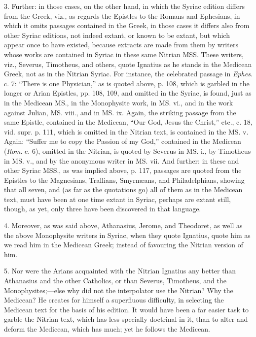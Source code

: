 3. Further: in those cases, on
the other hand, in which the Syriac edition differs from the Greek,
viz., as regards the Epistles to the Romans and Ephesians, in which it
omits passages contained in the Greek, in those cases it differs also
from other Syriac editions, not indeed extant, or known to be extant,
but which appear once to have existed, because extracts are made from
them by writers whose works are contained in Syriac in these same
Nitrian MSS. These writers, viz., Severus, Timotheus, and others,
quote Ignatius as he stands in the Medicean Greek, not as in the
Nitrian Syriac. For instance, the celebrated passage in \emph{Ephes}.
c. 7: ``There is one Physician,'' as is quoted above, p. 108, which
is garbled in the longer or Arian Epistles, pp. 108, 109, and omitted
in the Syriac, is found, just as in the Medicean MS., in the
Monophysite work, in MS. vi., and in the work against Julian, MS.
viii., and in MS. ix. Again, the striking passage from the same
Epistle, contained in the Medicean, ``Our God, Jesus the Christ,'' etc.,
c. 18, vid. supr. p. 111, which is omitted in the Nitrian text, is
contained in the MS. v. Again: ``Suffer me to copy the Passion of
my God,'' contained in the Medicean (\emph{Rom}. c. 6), omitted in the
Nitrian, is quoted by Severus in MS. i., by Timotheus in MS. v., and
by the anonymous writer in MS. vii. And further: in these and other
Syriac MSS., as was implied above, p. 117, passages are quoted from
the Epistles to the Magnesians, Trallians, Smyrnæans, and
Philadelphians, showing that all seven, and (as far as the quotations
go) all of them as in the Medicean text, must have been at one time
extant in Syriac, perhaps are extant still, though, as yet, only three
have been discovered in that language.

4. Moreover, as was said
above, Athanasius, Jerome, and Theodoret, as well as the above
Monophysite writers in Syriac, when they quote Ignatius, quote him as
we read him in the Medicean Greek; instead of favouring the Nitrian
version of him.

5. Nor were the Arians
acquainted with the Nitrian Ignatius any better than Athanasius and
the other Catholics, or than Severus, Timotheus, and the Monophysites;—else
why did not the interpolator use the Nitrian? Why the Medicean? He
creates for himself a superfluous difficulty, in selecting the
Medicean text for the basis of his edition. It would have been a far
easier task to garble the Nitrian text, which has less specially
doctrinal in it, than to alter and deform the Medicean, which has
much; yet he follows the Medicean.

